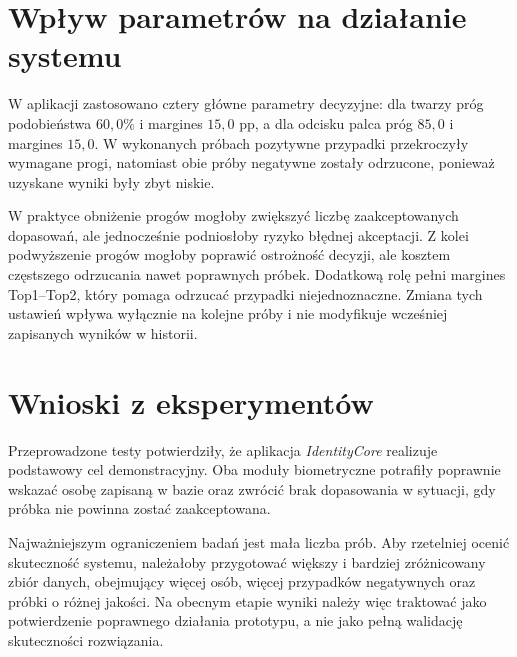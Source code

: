 \section{Wpływ parametrów na działanie systemu}

W aplikacji zastosowano cztery główne parametry decyzyjne: dla twarzy próg podobieństwa \(60{,}0\%\) i margines \(15{,}0\) pp, a dla odcisku palca próg \(85{,}0\) i margines \(15{,}0\). W wykonanych próbach pozytywne przypadki przekroczyły wymagane progi, natomiast obie próby negatywne zostały odrzucone, ponieważ uzyskane wyniki były zbyt niskie.

W praktyce obniżenie progów mogłoby zwiększyć liczbę zaakceptowanych dopasowań, ale jednocześnie podniosłoby ryzyko błędnej akceptacji. Z kolei podwyższenie progów mogłoby poprawić ostrożność decyzji, ale kosztem częstszego odrzucania nawet poprawnych próbek. Dodatkową rolę pełni margines Top1--Top2, który pomaga odrzucać przypadki niejednoznaczne. Zmiana tych ustawień wpływa wyłącznie na kolejne próby i nie modyfikuje wcześniej zapisanych wyników w historii.

\section{Wnioski z eksperymentów}

Przeprowadzone testy potwierdziły, że aplikacja \textit{IdentityCore} realizuje podstawowy cel demonstracyjny. Oba moduły biometryczne potrafiły poprawnie wskazać osobę zapisaną w bazie oraz zwrócić brak dopasowania w sytuacji, gdy próbka nie powinna zostać zaakceptowana.

Najważniejszym ograniczeniem badań jest mała liczba prób. Aby rzetelniej ocenić skuteczność systemu, należałoby przygotować większy i bardziej zróżnicowany zbiór danych, obejmujący więcej osób, więcej przypadków negatywnych oraz próbki o różnej jakości. Na obecnym etapie wyniki należy więc traktować jako potwierdzenie poprawnego działania prototypu, a nie jako pełną walidację skuteczności rozwiązania.